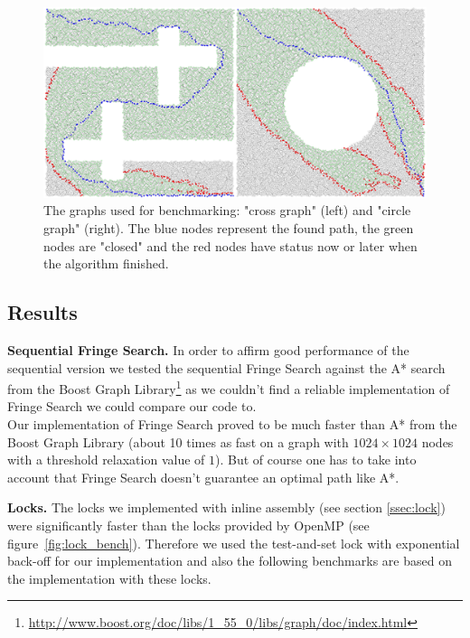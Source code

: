 \documentclass[letterpaper]{article}
\newcommand{\mypar}[1]{{\bf #1.}}
\begin{document}
\begin{figure}[h]\centering
  \includegraphics[scale=0.3]{benchmark_graphs.eps}
  \caption{The graphs used for benchmarking: "cross graph" (left) and "circle graph" (right). The blue nodes represent the found path, the green nodes are "closed" and the red nodes have status now or later when the algorithm finished. \label{fig:graphs}}
\end{figure}

\subsection{Results}\label{ssec:results}

\mypar{Sequential Fringe Search}
In order to affirm good performance of the sequential version we tested the sequential Fringe Search against the A* search from the Boost Graph Library\footnote{\url{http://www.boost.org/doc/libs/1_55_0/libs/graph/doc/index.html}} as we couldn't find a reliable implementation of Fringe Search we could compare our code to.\\
Our implementation of Fringe Search proved to be much faster than A* from the Boost Graph Library (about 10 times as fast on a graph with $1024 \times 1024$ nodes with a threshold relaxation value of $1$). But of course one has to take into account that Fringe Search doesn't guarantee an optimal path like A*.

\mypar{Locks}
The locks we implemented with inline assembly (see section \ref{ssec:lock}) were significantly faster than the locks provided by OpenMP (see figure~\ref{fig:lock_bench}). Therefore we used the test-and-set lock with exponential back-off for our implementation and also the following benchmarks are based on the implementation with these locks.
\end{document}
